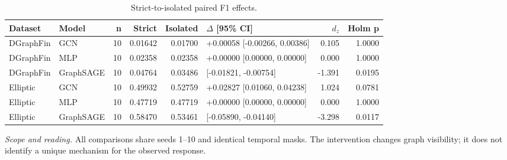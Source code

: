 \begin{table}[tbp]
\centering
\footnotesize
\setlength{\tabcolsep}{3.2pt}
\renewcommand{\arraystretch}{1.12}
\caption{Strict-to-isolated paired F1 effects.}
\label{tab:s-protocol-f1}
\begin{tabularx}{\textwidth}{@{}>{\raggedright\arraybackslash}p{} >{\raggedright\arraybackslash}p{} r r r >{\raggedright\arraybackslash}p{} r r@{}}
\toprule
\textbf{Dataset} & \textbf{Model} & \textbf{n} & \textbf{Strict} & \textbf{Isolated} & \textbf{$\Delta$ [95\% CI]} & \textbf{$d_z$} & \textbf{Holm p} \\
\midrule
DGraphFin & GCN & 10 & 0.01642 & 0.01700 & +0.00058 [-0.00266, 0.00386] & 0.105 & 1.0000 \\
DGraphFin & MLP & 10 & 0.02358 & 0.02358 & +0.00000 [0.00000, 0.00000] & 0.000 & 1.0000 \\
DGraphFin & GraphSAGE & 10 & 0.04764 & 0.03486 & -0.01278 [-0.01821, -0.00754] & -1.391 & 0.0195 \\
Elliptic & GCN & 10 & 0.49932 & 0.52759 & +0.02827 [0.01060, 0.04238] & 1.024 & 0.0781 \\
Elliptic & MLP & 10 & 0.47719 & 0.47719 & +0.00000 [0.00000, 0.00000] & 0.000 & 1.0000 \\
Elliptic & GraphSAGE & 10 & 0.58470 & 0.53461 & -0.05009 [-0.05890, -0.04140] & -3.298 & 0.0117 \\
\bottomrule
\end{tabularx}
\vspace{2pt}
\begin{minipage}{\textwidth}\footnotesize\emph{Scope and reading.} All comparisons share seeds 1--10 and identical temporal masks. The intervention changes graph visibility; it does not identify a unique mechanism for the observed response.\end{minipage}
\end{table}
